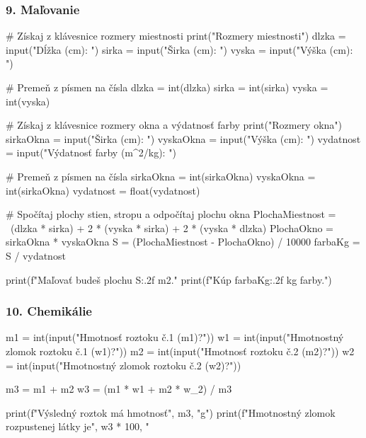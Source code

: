 \subsubsection*{9. Maľovanie}
\begin{solution}
# Získaj z klávesnice rozmery miestnosti
print("Rozmery miestnosti")
dlzka = input("Dĺžka (cm): ")
sirka = input("Širka (cm): ")
vyska = input("Výška (cm): ")

# Premeň z písmen na čísla
dlzka = int(dlzka)
sirka = int(sirka)
vyska = int(vyska)

# Získaj z klávesnice rozmery okna a výdatnosť farby
print("Rozmery okna")
sirkaOkna = input("Širka (cm): ")
vyskaOkna = input("Výška (cm): ")
vydatnost = input("Výdatnosť farby (m^2/kg): ")

# Premeň z písmen na čísla
sirkaOkna = int(sirkaOkna)
vyskaOkna = int(sirkaOkna)
vydatnost = float(vydatnost)

# Spočítaj plochy stien, stropu a odpočítaj plochu okna
PlochaMiestnost = \
(dlzka * sirka) + 2 * (vyska * sirka) + 2 * (vyska * dlzka)
PlochaOkno = sirkaOkna * vyskaOkna
S = (PlochaMiestnost - PlochaOkno) / 10000
farbaKg = S / vydatnost

print(f"Maľovať budeš plochu {S:.2f} m2."
print(f"Kúp {farbaKg:.2f} kg farby.")
\end{solution}

\subsubsection*{10. Chemikálie}
\begin{solution}
m1 = int(input("Hmotnosť roztoku č.1 (m1)?"))
w1 = int(input("Hmotnostný zlomok roztoku č.1 (w1)?"))
m2 = int(input("Hmotnosť roztoku č.2 (m2)?"))
w2 = int(input("Hmotnostný zlomok roztoku č.2 (w2)?"))

m3 = m1 + m2
w3 = (m1 * w1 + m2 * w_2) / m3

print(f"Výsledný roztok má hmotnosť", m3, "g")
print(f"Hmotnostný zlomok rozpustenej látky je", w3 * 100, "%
\end{solution}

